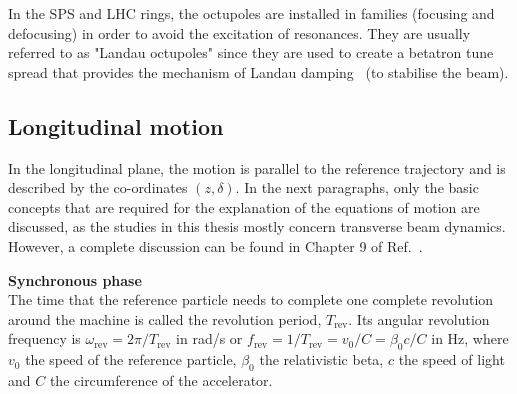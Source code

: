 In the SPS and LHC rings, the octupoles are installed in families (focusing and defocusing) in order to avoid the excitation of resonances. They are usually referred to as "Landau octupoles" since they are used to create a betatron tune spread that provides the mechanism of Landau damping~\cite{Herr:1982428} (to stabilise the beam).

\subsection{Longitudinal motion}
In the longitudinal plane, the motion is parallel to the reference trajectory and is described by the co-ordinates $(z, \delta)$. In the next paragraphs, only the basic concepts that are required for the explanation of the equations of motion are discussed, as the studies in this thesis mostly concern transverse beam dynamics. However, a complete discussion can be found in Chapter 9 of Ref.~\cite{Wiedemann:1083415}.



\textbf{Synchronous phase}\\
The time that the reference particle needs to complete one complete revolution around the machine is called the revolution period, $T_\mathrm{rev}$. Its angular revolution frequency is $\omega_\mathrm{rev} = 2\pi /T_\mathrm{rev}$ in rad/s or $f_\mathrm{rev}=1/T_\mathrm{rev} =  v_0/C = \beta_0 c/C$ in Hz, where $v_0$ the speed of the reference particle, $\beta_0$ the relativistic beta, $c$ the speed of light and $C$ the circumference of the accelerator.

